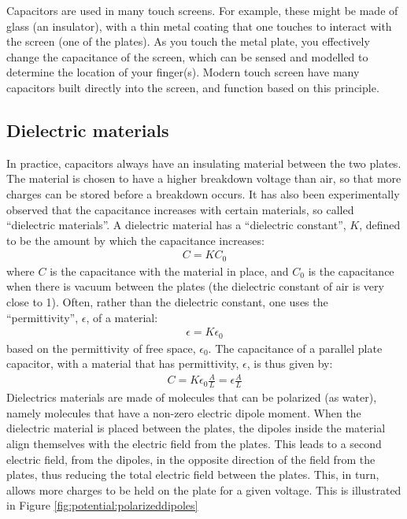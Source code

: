 Capacitors are used in many touch screens. For example, these might be made of glass (an insulator), with a thin metal coating that one touches to interact with the screen (one of the plates). As you touch the metal plate, you effectively change the capacitance of the screen, which can be sensed and modelled to determine the location of your finger(s). Modern touch screen have many capacitors built directly into the screen, and function based on this principle. 

\subsection{Dielectric materials}
In practice, capacitors always have an insulating material between the two plates. The material is chosen to have a higher breakdown voltage than air, so that more charges can be stored before a breakdown occurs. It has also been experimentally observed that the capacitance increases with certain materials, so called ``dielectric materials''. A dielectric material has a ``dielectric constant'', $K$, defined to be the amount by which the capacitance increases:
\begin{align*}
C=KC_0
\end{align*}
where $C$ is the capacitance with the material in place, and $C_0$ is the capacitance when there is vacuum between the plates (the dielectric constant of air is very close to 1). Often, rather than the dielectric constant, one uses the ``permittivity'', $\epsilon$, of a material:
\begin{align*}
\epsilon=K\epsilon_0
\end{align*}
based on the permittivity of free space, $\epsilon_0$. The capacitance of a parallel plate capacitor, with a material that has permittivity, $\epsilon$, is thus given by:
\begin{align*}
C=K\epsilon_0\frac{A}{L}=\epsilon\frac{A}{L}
\end{align*}
Dielectrics materials are made of molecules that can be polarized (as water), namely molecules that have a non-zero electric dipole moment. When the dielectric material is placed between the plates, the dipoles inside the material align themselves with the electric field from the plates. This leads to a second electric field, from the dipoles, in the opposite direction of the field from the plates, thus reducing the total electric field between the plates. This, in turn, allows more charges to be held on the plate for a given voltage. This is illustrated in Figure \ref{fig:potential:polarizeddipoles}

